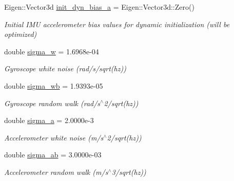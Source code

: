 \begin{DoxyCompactItemize}
Eigen\+::\+Vector3d \hyperlink{structov__init_1_1InertialInitializerOptions_ab810afe7877d06a6154fa4f28d23051d}{init\+\_\+dyn\+\_\+bias\+\_\+a} = Eigen\+::\+Vector3d\+::\+Zero()
\begin{DoxyCompactList}\small\item\em Initial I\+MU accelerometer bias values for dynamic initialization (will be optimized) \end{DoxyCompactList}\item 
\mbox{\label{structov__init_1_1InertialInitializerOptions_ab0e1f45c83f23902d5060d233b2c322b}} 
double \hyperlink{structov__init_1_1InertialInitializerOptions_ab0e1f45c83f23902d5060d233b2c322b}{sigma\+\_\+w} = 1.\+6968e-\/04
\begin{DoxyCompactList}\small\item\em Gyroscope white noise (rad/s/sqrt(hz)) \end{DoxyCompactList}\item 
\mbox{\label{structov__init_1_1InertialInitializerOptions_a3a7ed5c1ae5ca754dcc11feecc478bb7}} 
double \hyperlink{structov__init_1_1InertialInitializerOptions_a3a7ed5c1ae5ca754dcc11feecc478bb7}{sigma\+\_\+wb} = 1.\+9393e-\/05
\begin{DoxyCompactList}\small\item\em Gyroscope random walk (rad/s$^\wedge$2/sqrt(hz)) \end{DoxyCompactList}\item 
\mbox{\label{structov__init_1_1InertialInitializerOptions_a1ee315c6230a76c677e879bf4b0b2115}} 
double \hyperlink{structov__init_1_1InertialInitializerOptions_a1ee315c6230a76c677e879bf4b0b2115}{sigma\+\_\+a} = 2.\+0000e-\/3
\begin{DoxyCompactList}\small\item\em Accelerometer white noise (m/s$^\wedge$2/sqrt(hz)) \end{DoxyCompactList}\item 
\mbox{\label{structov__init_1_1InertialInitializerOptions_ae096e5a68f56d98e738383add8b42526}} 
double \hyperlink{structov__init_1_1InertialInitializerOptions_ae096e5a68f56d98e738383add8b42526}{sigma\+\_\+ab} = 3.\+0000e-\/03
\begin{DoxyCompactList}\small\item\em Accelerometer random walk (m/s$^\wedge$3/sqrt(hz)) \end{DoxyCompactList}\item 

\end{DoxyCompactItemize}
